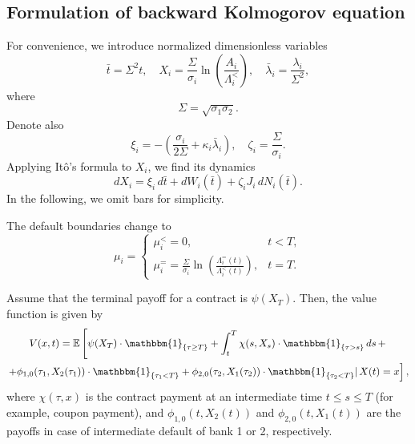 \subsection{Formulation of backward Kolmogorov equation}
For convenience, we introduce normalized dimensionless variables
\begin{equation}
	\bar{t} = \Sigma^2 t, \quad X_i = \frac{\Sigma}{\sigma_i} \ln \left(\frac{A_i}{\Lambda_i^{<}}\right), \quad \bar{\lambda}_i = \frac{\lambda_i}{\Sigma^2},
\end{equation}
where
\begin{equation*}
	\Sigma = \sqrt{\sigma_1 \sigma_2}.
\end{equation*}
Denote also
\begin{equation}
	\xi_i = -\left( \frac{\sigma_i}{2 \Sigma} + \kappa_i \bar{\lambda}_i\right), \quad \zeta_i = \frac{\Sigma}{\sigma_i}.
\end{equation}
Applying Itô's formula to $X_i$, we find its dynamics
\begin{equation}
	d X_i = \xi_i \, d \bar{t} + d W_i(\bar{t}) + \zeta_i J_i \, d N_i(\bar{t}).
\end{equation}
In the following, we omit bars for simplicity.

The default boundaries change to 
\begin{equation}
	\mu_i =
	\begin{cases}
		\mu_i^{<} = 0, & t < T, \\
		\mu_i^{=} = \frac{\Sigma}{\sigma_i} \ln \left(\frac{\Lambda_i^{=}(t)}{\Lambda_i^{<}(t)} \right), & t = T.
	\end{cases}
\end{equation}

Assume that the terminal payoff for a contract is $\psi(X_T)$. Then, the value function is given by
\begin{multline}
	V(x, t) = \mathbb{E} \left[\psi(X_T) \cdot \mathbbm{1}_{\{\tau \ge T \}}  + \int_t^T \chi(s, X_s) \cdot \mathbbm{1}_{\{\tau > s \}}  \, d s \, + \right. \\
	\left. + \phi_{1, 0}(\tau_1, X_2(\tau_1)) \cdot \mathbbm{1}_{\{\tau_1 < T \}} +  \phi_{2, 0}(\tau_2, X_1(\tau_2)) \cdot \mathbbm{1}_{\{\tau_2 < T \}} | \, X(t) = x \right],
\end{multline}
where $\chi(\tau, x)$ is the contract payment at an intermediate time $t \le s \le T$ (for example, coupon payment), and $\phi_{1, 0}(t, X_2(t))$ and  $\phi_{2, 0}(t, X_1(t))$ are the payoffs in case of intermediate default of bank 1 or 2, respectively.

